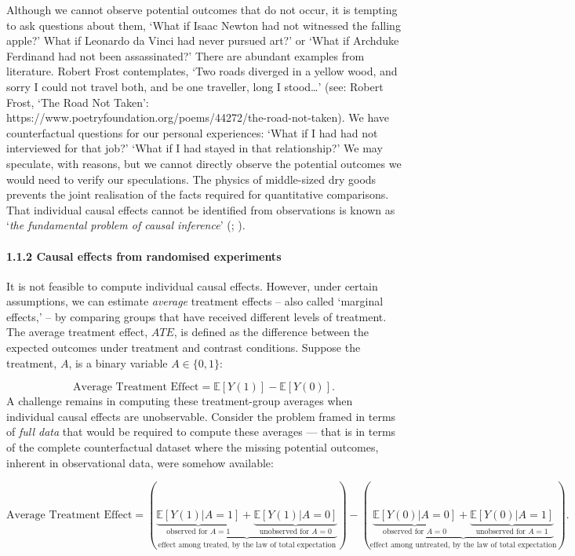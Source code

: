 \documentclass[
  singlecolumn]{article}
\let\oldparagraph\paragraph
\renewcommand{\paragraph}[1]{\oldparagraph{#1}\mbox{}}
\begin{document}
Although we cannot observe potential outcomes that do not occur, it is
tempting to ask questions about them, `What if Isaac Newton had not
witnessed the falling apple?' What if Leonardo da Vinci had never
pursued art?' or `What if Archduke Ferdinand had not been assassinated?'
There are abundant examples from literature. Robert Frost contemplates,
`Two roads diverged in a yellow wood, and sorry I could not travel both,
and be one traveller, long I stood\ldots{}' (see: Robert Frost, `The
Road Not Taken':
https://www.poetryfoundation.org/poems/44272/the-road-not-taken). We
have counterfactual questions for our personal experiences: `What if I
had had not interviewed for that job?' `What if I had stayed in that
relationship?' We may speculate, with reasons, but we cannot directly
observe the potential outcomes we would need to verify our speculations.
The physics of middle-sized dry goods prevents the joint realisation of
the facts required for quantitative comparisons. That individual causal
effects cannot be identified from observations is known as `\emph{the
fundamental problem of causal inference}'
(;
).

\paragraph{1.1.2 Causal effects from randomised
experiments}\label{causal-effects-from-randomised-experiments}

It is not feasible to compute individual causal effects. However, under
certain assumptions, we can estimate \emph{average} treatment effects --
also called `marginal effects,' -- by comparing groups that have
received different levels of treatment. The average treatment effect,
\(ATE\), is defined as the difference between the expected outcomes
under treatment and contrast conditions. Suppose the treatment, \(A\),
is a binary variable \(A \in \{0,1\}\):

\[
\text{Average Treatment Effect}  = \mathbb{E}[Y(1)] - \mathbb{E}[Y(0)].
\] A challenge remains in computing these treatment-group averages when
individual causal effects are unobservable. Consider the problem framed
in terms of \emph{full data} that would be required to compute these
averages --- that is in terms of the complete counterfactual dataset
where the missing potential outcomes, inherent in observational data,
were somehow available:

\[
\text{Average Treatment Effect} = \left(\underbrace{\underbrace{\mathbb{E}[Y(1)|A = 1]}_{\text{observed for } A = 1} + \underbrace{\mathbb{E}[Y(1)|A = 0]}_{\text{unobserved for } A = 0}}_{\text{effect among treated, by the law of total expectation}}\right) - \left(\underbrace{\underbrace{\mathbb{E}[Y(0)|A = 0]}_{\text{observed for } A = 0} + \underbrace{\mathbb{E}[Y(0)|A = 1]}_{\text{unobserved for } A = 1}}_{\text{effect among untreated, by the law of total expectation}}\right).
\]
\end{document}
